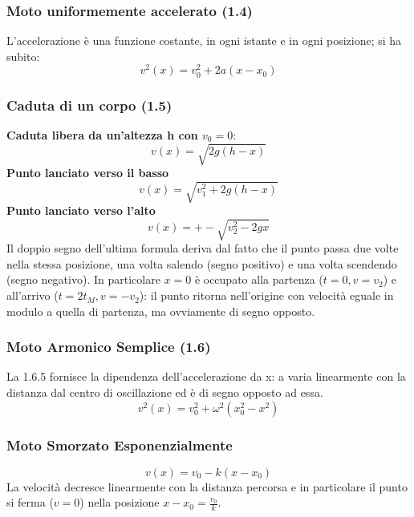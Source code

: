 \documentclass{article}
\numberwithin{equation}{subsection}
\begin{document}
\subsubsection{Moto uniformemente accelerato (1.4)}
L'accelerazione è una funzione costante, in ogni istante e in ogni posizione; si ha subito:
\begin{equation}
    v^2(x)=v_0^2 + 2a(x-x_0)
\end{equation}
\subsubsection{Caduta di un corpo (1.5)}
\textbf{Caduta libera da un'altezza h con $v_0=0$}:
\begin{equation}
    v(x)=\sqrt{2g(h-x)}
\end{equation}
\textbf{Punto lanciato verso il basso}
\begin{equation}
    v(x)=\sqrt{v_1^2+2g(h-x)}
\end{equation}
\textbf{Punto lanciato verso l'alto}
\begin{equation}
    v(x)=+-\sqrt{v_2^2-2gx}
\end{equation}
Il doppio segno dell'ultima formula deriva dal fatto che il punto passa due volte nella stessa posizione, una volta salendo (segno positivo) e una volta scendendo (segno negativo). In particolare $x=0$ è occupato alla partenza ($t=0,v=v_2$) e all'arrivo ($t=2t_M, v=-v_2$): il punto ritorna nell'origine con velocità eguale in modulo a quella di partenza, ma ovviamente di segno opposto.
\subsubsection{Moto Armonico Semplice (1.6)}
La 1.6.5 fornisce la dipendenza dell'accelerazione da x: a varia linearmente con la distanza dal centro di oscillazione ed è di segno opposto ad essa. 
\begin{equation}
    v^2(x)=v_0^2+\omega^2(x_0^2-x^2)
\end{equation}
\subsubsection{Moto Smorzato Esponenzialmente}
\begin{equation}
    v(x)=v_0-k(x-x_0)
\end{equation}
La velocità decresce linearmente con la distanza percorsa e in particolare il punto si ferma ($v=0$) nella posizione $x-x_0=\frac{v_0}{k}$.
\end{document}
